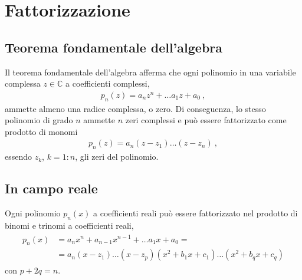 \documentclass[letterpaper,10pt,italian]{jupyterBook}
\begin{document}
\section{Fattorizzazione}
\label{\detokenize{ch/precalculus/polynomials:fattorizzazione}}
\sphinxAtStartPar
{} 


\subsection{Teorema fondamentale dell’algebra}
\label{\detokenize{ch/precalculus/polynomials:teorema-fondamentale-dell-algebra}}\label{\detokenize{ch/precalculus/polynomials:math-hs-precalculus-polynomials-alg-fund-thm}}
\sphinxAtStartPar
Il teorema fondamentale dell’algebra afferma che ogni polinomio in una variabile complessa \(z \in \mathbb{C}\) a coefficienti complessi,
\begin{equation*}
\begin{split}p_n(z) = a_n z^n + \dots a_1 z + a_0 \ ,\end{split}
\end{equation*}
\sphinxAtStartPar
ammette almeno una radice complessa, o zero. Di conseguenza, lo stesso polinomio di grado \(n\) ammette \(n\) zeri complessi e può essere fattorizzato come prodotto di monomi
\begin{equation*}
\begin{split}p_n(z) = a_n ( z - z_1 ) \dots ( z - z_n ) \ ,\end{split}
\end{equation*}
\sphinxAtStartPar
essendo \(z_k\), \(k=1:n\), gli zeri del polinomio.


\subsection{In campo reale}
\label{\detokenize{ch/precalculus/polynomials:in-campo-reale}}
\sphinxAtStartPar
Ogni polinomio \(p_n(x)\) a coefficienti reali può essere fattorizzato nel prodotto di binomi e trinomi a coefficienti reali,
\begin{equation*}
\begin{split}\begin{aligned}
  p_n(x) & = a_n x^n + a_{n-1} x^{n-1} + \dots a_1 x + a_0 = \\
         & =a_n ( x - z_1 ) \dots ( x - z_p ) ( x^2 + b_1 x + c_1 ) \dots ( x^2 + b_q x + c_q )
\end{aligned}\end{split}
\end{equation*}
\sphinxAtStartPar
con \(p + 2q = n\).
\end{document}
